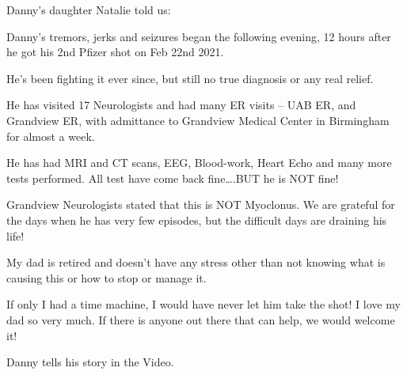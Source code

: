 Danny’s daughter Natalie told us:

Danny’s tremors, jerks and seizures began the following evening, 12 hours after he got his 2nd Pfizer shot on Feb 22nd 2021.

He’s been fighting it ever since, but still no true diagnosis or any real relief.

He has visited 17 Neurologists and had many ER visits – UAB ER, and Grandview ER, with admittance to Grandview Medical Center in Birmingham for almost a week.

He has had MRI and CT scans, EEG, Blood-work, Heart Echo and many more tests performed. All test have come back fine….BUT he is NOT fine!

Grandview Neurologists stated that this is NOT Myoclonus. We are grateful for the days when he has very few episodes, but the difficult days are draining his life!

My dad is retired and doesn’t have any stress other than not knowing what is causing this or how to stop or manage it.

If only I had a time machine, I would have never let him take the shot! I love my dad so very much. If there is anyone out there that can help, we would welcome it!

Danny tells his story in the Video.

